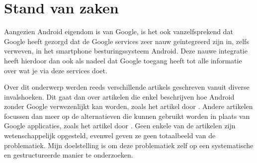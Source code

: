 
\section{Stand van zaken}
\label{sec:state-of-the-art}

Aangezien Android eigendom is van Google, is het ook vanzelfsprekend dat Google heeft gezorgd dat de Google services zeer nauw geïntegreerd zijn in, zelfs verweven, in het smartphone besturingssysteem Android. Deze nauwe integratie heeft hierdoor dan ook als nadeel dat Google toegang heeft tot alle informatie over wat je via deze services doet.

\vspace{3mm}

\noindent Over dit onderwerp werden reeds verschillende artikels geschreven vanuit diverse invalshoeken. Dit gaat dan over artikelen die enkel beschrijven hoe Android zonder Google verwezenlijkt kan worden, zoals het artikel door \autocite{BertelKing2016}. Andere artikelen focussen dan meer op de alternatieven die kunnen gebruikt worden in plaats van Google applicaties, zoals het artikel door \autocite{EricFerrari2017}. Geen enkele van de artikelen zijn wetenschappelijk opgesteld, evenwel geven ze geen totaalbeeld van de problematiek. Mijn doelstelling is om deze problematiek zelf op een systematische en gestructureerde manier te onderzoeken.




